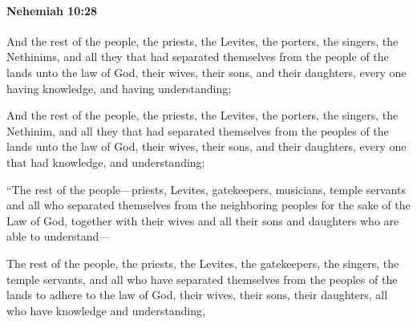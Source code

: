 		\paragraph{Nehemiah 10:28} %
			\label{NEHEMIAH-10-28}

			And the rest of the people, the priests, the Levites, the porters, the singers, the Nethinims, and all they that had separated themselves from the people of the lands unto the law of God, their wives, their sons, and their daughters, every one having knowledge, and having understanding;

			\begin{versebox}
					\item[BHS] 
					\item[LXX] 
					\item[ASV] And the rest of the people, the priests, the Levites, the porters, the singers, the Nethinim, and all they that had separated themselves from the peoples of the lands unto the law of God, their wives, their sons, and their daughters, every one that had knowledge, and understanding;
					\item[NIV] “The rest of the people—priests, Levites, gatekeepers, musicians, temple servants and all who separated themselves from the neighboring peoples for the sake of the Law of God, together with their wives and all their sons and daughters who are able to understand—
					\item[NRSV] The rest of the people, the priests, the Levites, the gatekeepers, the singers, the temple servants, and all who have separated themselves from the peoples of the lands to adhere to the law of God, their wives, their sons, their daughters, all who have knowledge and understanding,
			\end{versebox}

